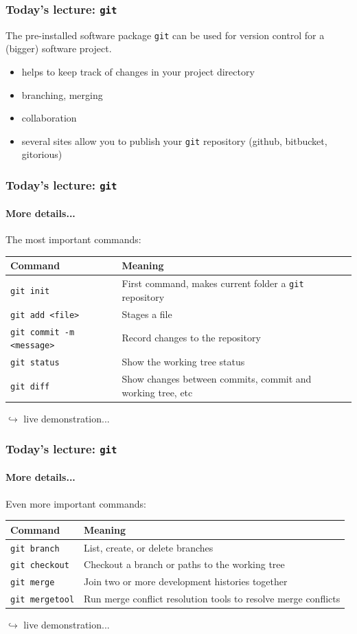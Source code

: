 \documentclass{beamer}
\begin{document}
\begin{frame}
\frametitle{Today's lecture: \texttt{git}}
The pre-installed software package \texttt{git} can be used for version control for a (bigger) software project.
\begin{itemize}
 \item helps to keep track of changes in your project directory
 \item branching, merging
 \item collaboration
 \item several sites allow you to publish your \texttt{git} repository (github, bitbucket, gitorious) 
\end{itemize}
\end{frame}
\begin{frame}
\frametitle{Today's lecture: \texttt{git}}
\framesubtitle{More details...}
The most important commands:

\begin{table}
\begin{tabularx}{\textwidth}{l|X}
Command & Meaning \\
 \hline
 \texttt{git init} & First command, makes current folder a \texttt{git} repository\\
 \texttt{git add <file>} & Stages a file\\
 \texttt{git commit -m <message>} & Record changes to the repository\\
 \texttt{git status} & Show the working tree status\\
 \texttt{git diff} & Show changes between commits, commit and working tree, etc\\
\end{tabularx}
\end{table}
\hfill $\hookrightarrow$ live demonstration...
\end{frame}
\begin{frame}
\frametitle{Today's lecture: \texttt{git}}
\framesubtitle{More details...}
Even more important commands:
\begin{table}
\begin{tabularx}{\textwidth}{l|X}
Command & Meaning \\
 \hline
 \texttt{git branch} & List, create, or delete branches\\
 \texttt{git checkout} & Checkout a branch or paths to the working tree\\
 \texttt{git merge} & Join two or more development histories together\\
 \texttt{git mergetool} & Run merge conflict resolution tools to resolve merge conflicts\\
\end{tabularx}
\end{table}
\hfill $\hookrightarrow$ live demonstration...
\end{frame}
\end{document}
